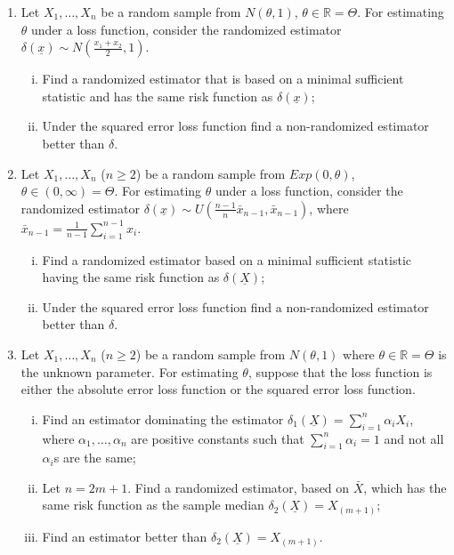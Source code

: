 \documentclass[11pt]{article}
\begin{document}
\begin{enumerate}
    \item Let $X_{1}, \dots, X_{n}$ be a random sample from $N(\theta, 1)$, $\theta \in \mathbb{R} = \Theta$. For estimating $\theta$ under a loss function, consider the randomized estimator $\delta(\underline{x}) \sim N(\frac{x_{1} + x_{2}}{2}, 1)$.
    \begin{enumerate}[(i)]
        \item Find a randomized estimator that is based on a minimal sufficient statistic and has the same risk function as $\delta(\underline{x})$;
        \item Under the squared error loss function find a non-randomized estimator better than $\delta$.
    \end{enumerate}

    \item Let $X_{1}, \dots, X_{n}$ ($n \ge 2$) be a random sample from $Exp(0, \theta)$, $\theta \in (0, \infty) = \Theta$. For estimating $\theta$ under a loss function, consider the randomized estimator $\delta(\underline{x}) \sim U(\frac{n-1}{n} \bar{x}_{n-1}, \bar{x}_{n-1})$, where $\bar{x}_{n-1} = \frac{1}{n-1} \sum_{i=1}^{n-1} x_{i}$.
    \begin{enumerate}[(i)]
        \item Find a randomized estimator based on a minimal sufficient statistic having the same risk function as $\delta(\underline{X})$;
        \item Under the squared error loss function find a non-randomized estimator better than $\delta$.
    \end{enumerate}

    \item Let $X_{1}, \dots, X_{n}$ ($n \ge 2$) be a random sample from $N(\theta, 1)$ where $\theta \in \mathbb{R} = \Theta$ is the unknown parameter. For estimating $\theta$, suppose that the loss function is either the absolute error loss function or the squared error loss function.
    \begin{enumerate}[(i)]
        \item Find an estimator dominating the estimator $\delta_{1}(\underline{X}) = \sum_{i=1}^{n} \alpha_{i} X_{i}$, where $\alpha_{1}, \dots, \alpha_{n}$ are positive constants such that $\sum_{i=1}^{n} \alpha_{i} = 1$ and not all $\alpha_{i}$s are the same;
        \item Let $n = 2m + 1$. Find a randomized estimator, based on $\bar{X}$, which has the same risk function as the sample median $\delta_{2}(\underline{X}) = X_{(m+1)}$;
        \item Find an estimator better than $\delta_{2}(\underline{X}) = X_{(m+1)}$.
    \end{enumerate}


\end{enumerate}
\end{document}
